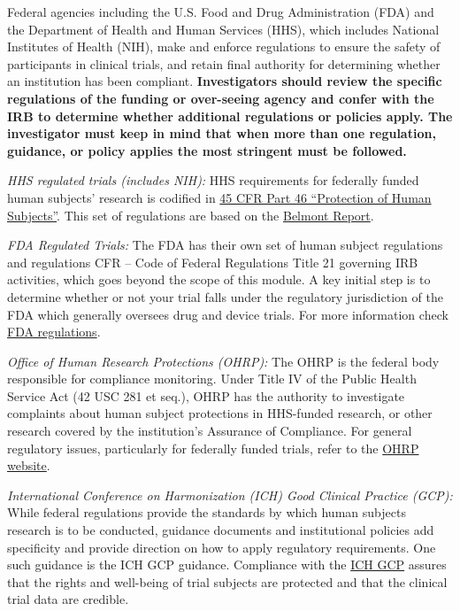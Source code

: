 \documentclass[]{book}
\theoremstyle{definition}
\theoremstyle{definition}
\theoremstyle{definition}
\theoremstyle{remark}
\begin{document}
Federal agencies including the U.S. Food and Drug Administration (FDA)
and the Department of Health and Human Services (HHS), which includes
National Institutes of Health (NIH), make and enforce regulations to
ensure the safety of participants in clinical trials, and retain final
authority for determining whether an institution has been compliant.
\textbf{Investigators should review the specific regulations of the
funding or over-seeing agency and confer with the IRB to determine
whether additional regulations or policies apply. The investigator must
keep in mind that when more than one regulation, guidance, or policy
applies the most stringent must be followed.}

\emph{HHS regulated trials (includes NIH):} HHS requirements for
federally funded human subjects' research is codified in
\href{http://www.hhs.gov/ohrp/regulations-and-policy/regulations/45-cfr-46/}{45
CFR Part 46 ``Protection of Human Subjects''}. This set of regulations
are based on the
\href{http://www.hhs.gov/ohrp/regulations-and-policy/belmont-report/}{Belmont
Report}.

\emph{FDA Regulated Trials:} The FDA has their own set of human subject
regulations and regulations CFR -- Code of Federal Regulations Title 21
governing IRB activities, which goes beyond the scope of this module. A
key initial step is to determine whether or not your trial falls under
the regulatory jurisdiction of the FDA which generally oversees drug and
device trials. For more information check
\href{http://www.fda.gov/ScienceResearch/SpecialTopics/RunningClinicalTrials/ucm155713.htm}{FDA
regulations}.

\emph{Office of Human Research Protections (OHRP):} The OHRP is the
federal body responsible for compliance monitoring. Under Title IV of
the Public Health Service Act (42 USC 281 et seq.), OHRP has the
authority to investigate complaints about human subject protections in
HHS-funded research, or other research covered by the institution's
Assurance of Compliance. For general regulatory issues, particularly for
federally funded trials, refer to the
\href{http://www.hhs.gov/ohrp/}{OHRP website}.

\emph{International Conference on Harmonization (ICH) Good Clinical
Practice (GCP):} While federal regulations provide the standards by
which human subjects research is to be conducted, guidance documents and
institutional policies add specificity and provide direction on how to
apply regulatory requirements. One such guidance is the ICH GCP
guidance. Compliance with the
\href{http://www.ich.org/products/guidelines/efficacy/article/efficacy-guidelines.html}{ICH
GCP} assures that the rights and well-being of trial subjects are
protected and that the clinical trial data are credible.
\end{document}
